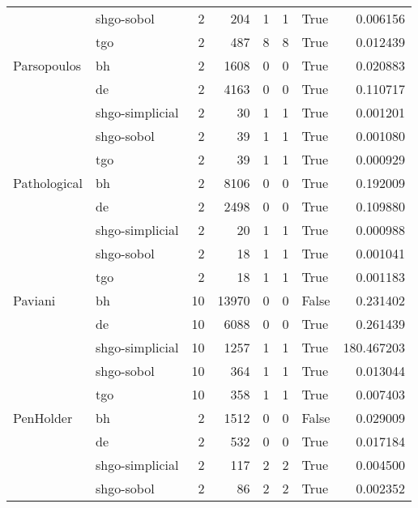 \begin{longtable}{llrrrrlr}
         & shgo-sobol &     2 &      204 &      1 &       1 &    True &    0.006156 \\
         & tgo &     2 &      487 &      8 &       8 &    True &    0.012439 \\
Parsopoulos & bh &     2 &     1608 &      0 &       0 &    True &    0.020883 \\
         & de &     2 &     4163 &      0 &       0 &    True &    0.110717 \\
         & shgo-simplicial &     2 &       30 &      1 &       1 &    True &    0.001201 \\
         & shgo-sobol &     2 &       39 &      1 &       1 &    True &    0.001080 \\
         & tgo &     2 &       39 &      1 &       1 &    True &    0.000929 \\
Pathological & bh &     2 &     8106 &      0 &       0 &    True &    0.192009 \\
         & de &     2 &     2498 &      0 &       0 &    True &    0.109880 \\
         & shgo-simplicial &     2 &       20 &      1 &       1 &    True &    0.000988 \\
         & shgo-sobol &     2 &       18 &      1 &       1 &    True &    0.001041 \\
         & tgo &     2 &       18 &      1 &       1 &    True &    0.001183 \\
Paviani & bh &    10 &    13970 &      0 &       0 &   False &    0.231402 \\
         & de &    10 &     6088 &      0 &       0 &    True &    0.261439 \\
         & shgo-simplicial &    10 &     1257 &      1 &       1 &    True &  180.467203 \\
         & shgo-sobol &    10 &      364 &      1 &       1 &    True &    0.013044 \\
         & tgo &    10 &      358 &      1 &       1 &    True &    0.007403 \\
PenHolder & bh &     2 &     1512 &      0 &       0 &   False &    0.029009 \\
         & de &     2 &      532 &      0 &       0 &    True &    0.017184 \\
         & shgo-simplicial &     2 &      117 &      2 &       2 &    True &    0.004500 \\
         & shgo-sobol &     2 &       86 &      2 &       2 &    True &    0.002352 \\

\end{longtable}

